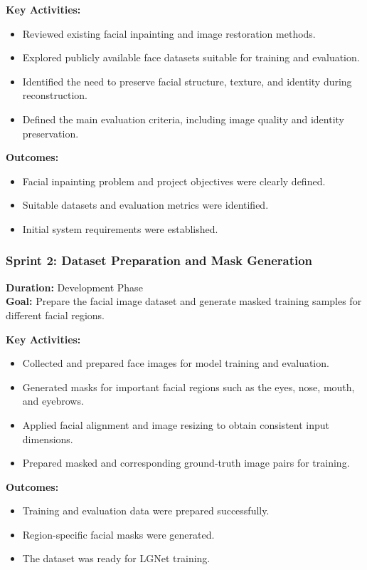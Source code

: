 \textbf{Key Activities:}
\begin{itemize}
    \item Reviewed existing facial inpainting and image restoration methods.
    \item Explored publicly available face datasets suitable for training and evaluation.
    \item Identified the need to preserve facial structure, texture, and identity during reconstruction.
    \item Defined the main evaluation criteria, including image quality and identity preservation.
\end{itemize}

\textbf{Outcomes:}
\begin{itemize}
    \item Facial inpainting problem and project objectives were clearly defined.
    \item Suitable datasets and evaluation metrics were identified.
    \item Initial system requirements were established.
\end{itemize}


\subsubsection{Sprint 2: Dataset Preparation and Mask Generation}
\textbf{Duration:} Development Phase\\
\textbf{Goal:} Prepare the facial image dataset and generate masked training samples for different facial regions.

\textbf{Key Activities:}
\begin{itemize}
    \item Collected and prepared face images for model training and evaluation.
    \item Generated masks for important facial regions such as the eyes, nose, mouth, and eyebrows.
    \item Applied facial alignment and image resizing to obtain consistent input dimensions.
    \item Prepared masked and corresponding ground-truth image pairs for training.
\end{itemize}

\textbf{Outcomes:}
\begin{itemize}
    \item Training and evaluation data were prepared successfully.
    \item Region-specific facial masks were generated.
    \item The dataset was ready for LGNet training.
\end{itemize}


